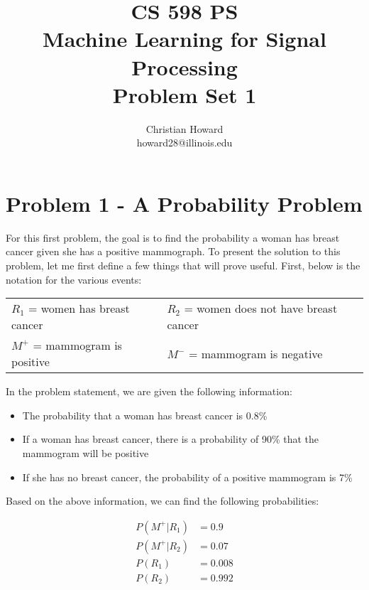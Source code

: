 \documentclass{article}[12pt]
\title{CS 598 PS \\ Machine Learning for Signal Processing \\ Problem Set 1}
\author{
Christian Howard \\ howard28@illinois.edu
}
\date{} %
\begin{document}
   
   \maketitle
   \newpage
   
   \tableofcontents
   \newpage
   
   \section{Problem 1 - A Probability Problem}
   For this first problem, the goal is to find the probability a woman has breast cancer given she has a positive mammograph. To present the solution to this problem, let me first define a few things that will prove useful. First, below is the notation for the various events:
   
   \vspace{10pt}
   \begin{tabular}{l l}
   $R_1$ = women has breast cancer & $R_2$ = women does not have breast cancer \\
   $M^{+}$ = mammogram is positive & $M^{-}$ = mammogram is negative
   \end{tabular}
   \vspace{10pt}   
   
   In the problem statement, we are given the following information:
   
   \begin{itemize}
   \item The probability that a woman has breast cancer is 0.8\%
   \item If a woman has breast cancer, there is a probability of 90\% that the mammogram will be positive
   \item If she has no breast cancer, the probability of a positive mammogram is 7\%
   \end{itemize}
   
   Based on the above information, we can find the following probabilities:
   
   \begin{align*}
   P(M^{+} | R_1) &= 0.9 \\
   P(M^{+} | R_2) &= 0.07 \\
   P(R_1) &= 0.008 \\
   P(R_2) &= 0.992
   \end{align*}
   
\end{document}
